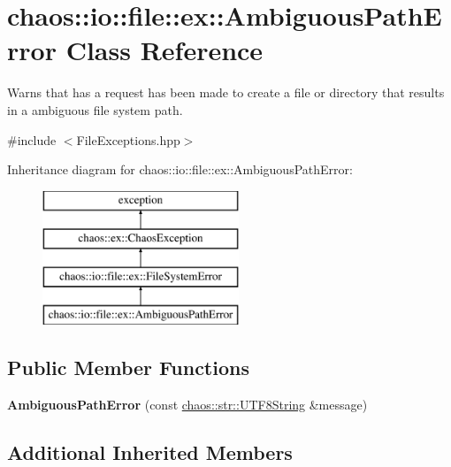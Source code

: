 \hypertarget{classchaos_1_1io_1_1file_1_1ex_1_1_ambiguous_path_error}{\section{chaos\-:\-:io\-:\-:file\-:\-:ex\-:\-:Ambiguous\-Path\-Error Class Reference}
\label{classchaos_1_1io_1_1file_1_1ex_1_1_ambiguous_path_error}
}


Warns that has a request has been made to create a file or directory that results in a ambiguous file system path.  




{\ttfamily \#include $<$File\-Exceptions.\-hpp$>$}

Inheritance diagram for chaos\-:\-:io\-:\-:file\-:\-:ex\-:\-:Ambiguous\-Path\-Error\-:\begin{figure}[H]
\begin{center}
\leavevmode
\includegraphics[height=4.000000cm]{classchaos_1_1io_1_1file_1_1ex_1_1_ambiguous_path_error}
\end{center}
\end{figure}
\subsection*{Public Member Functions}
\begin{DoxyCompactItemize}
\item 
\hypertarget{classchaos_1_1io_1_1file_1_1ex_1_1_ambiguous_path_error_a959cd9a1f6204c532cd6f33e29efb84c}{{\bfseries Ambiguous\-Path\-Error} (const \hyperlink{classchaos_1_1str_1_1_u_t_f8_string}{chaos\-::str\-::\-U\-T\-F8\-String} \&message)}\label{classchaos_1_1io_1_1file_1_1ex_1_1_ambiguous_path_error_a959cd9a1f6204c532cd6f33e29efb84c}

\end{DoxyCompactItemize}
\subsection*{Additional Inherited Members}


